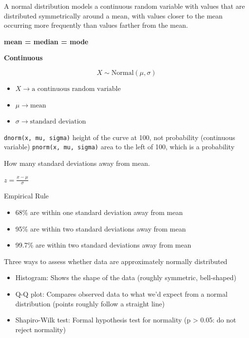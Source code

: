 \documentclass[
  letterpaper,
  DIV=11,
  numbers=noendperiod]{scrreprt}
\providecommand{\tightlist}{%
  \setlength{\itemsep}{0pt}\setlength{\parskip}{0pt}}
\begin{document}
A normal distribution models a continuous random variable with values
that are distributed symmetrically around a mean, with values closer to
the mean occurring more frequently than values farther from the mean.

\textbf{mean = median = mode}

\textbf{Continuous}

\[X\sim\text{Normal}(\mu,\sigma)\]

\begin{itemize}
\tightlist
\item
  \(X \rightarrow \text{a continuous random variable}\)
\item
  \(\mu \rightarrow \text{mean}\)
\item
  \(\sigma \rightarrow \text{standard deviation}\)
\end{itemize}

\texttt{dnorm(x,\ mu,\ sigma)} height of the curve at 100, not
probability (continuous variable) \texttt{pnorm(x,\ mu,\ sigma)} area to
the left of 100, which is a probability

\begin{description}
\tightlist
\item[Z-score]
How many standard deviations away from mean.
\end{description}

\(z=\frac{x-\mu}{\sigma}\)

Empirical Rule

\begin{itemize}
\tightlist
\item
  68\% are within one standard deviation away from mean \mu{}\sigma
\item
  95\% are within two standard deviations away from mean \mu{}\sigma
\item
  99.7\% are within two standard deviations away from mean \mu{}\sigma
\end{itemize}

Three ways to assess whether data are approximately normally distributed

\begin{itemize}
\tightlist
\item
  Histogram: Shows the shape of the data (roughly symmetric,
  bell-shaped)
\item
  Q-Q plot: Compares observed data to what we'd expect from a normal
  distribution (points roughly follow a straight line)
\item
  Shapiro-Wilk test: Formal hypothesis test for normality (p
  \textgreater{} 0.05: do not reject normality)
\end{itemize}
\end{document}
